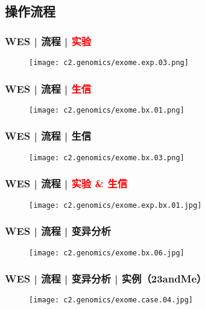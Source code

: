 \subsection{操作流程}
\begin{frame}
  \frametitle{WES | 流程 | \textcolor{red}{实验}}
  \begin{figure}
    \centering
    \texttt{[image: c2.genomics/exome.exp.03.png]}
  \end{figure}
\end{frame}

\begin{frame}
  \frametitle{WES | 流程 | \textcolor{red}{生信}}
  \begin{figure}
    \centering
    \texttt{[image: c2.genomics/exome.bx.01.png]}
  \end{figure}
\end{frame}

\begin{frame}
  \frametitle{WES | 流程 | 生信}
  \begin{figure}
    \centering
    \texttt{[image: c2.genomics/exome.bx.03.png]}
  \end{figure}
\end{frame}

\begin{frame}
  \frametitle{WES | 流程 | \textcolor{red}{实验 \& 生信}}
  \begin{figure}
    \centering
    \texttt{[image: c2.genomics/exome.exp.bx.01.jpg]}
  \end{figure}
\end{frame}

\begin{frame}
  \frametitle{WES | 流程 | 变异分析}
  \begin{figure}
    \centering
    \texttt{[image: c2.genomics/exome.bx.06.jpg]}
  \end{figure}
\end{frame}

\begin{frame}
  \frametitle{WES | 流程 | 变异分析 | 实例（23andMe）}
  \begin{figure}
    \centering
    \texttt{[image: c2.genomics/exome.case.04.jpg]}
  \end{figure}
\end{frame}


